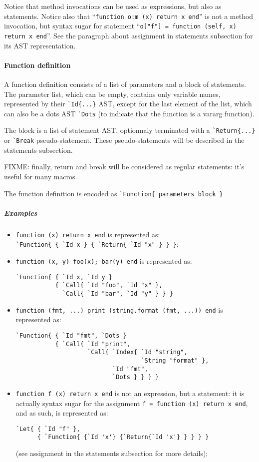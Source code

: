 Notice that method invocations can be used as expressions, but also as
statements.  Notice also that ``{\tt function o:m (x) return x end}'' is
not a method invocation, but syntax sugar for statement
``{\tt o["f"] = function (self, x) return x end}''. See the paragraph
about assignment in statements subsection for its AST representation.


\paragraph{Function definition}
A function definition consists of a list of parameters and a block of
statements. The parameter list, which can be empty, contains only
variable names, represented by their \verb+`Id{...}+ AST, except for
the last element of the list, which can also be a dots AST \verb+`Dots+
(to indicate that the function is a vararg function).

The block is a list of statement AST, optionnaly terminated with a
\verb+`Return{...}+ or \verb+`Break+ pseudo-statement. These
pseudo-statements will be described in the statements subsection.

FIXME: finally, return and break will be considered as regular
statements: it's useful for many macros.

The function definition is encoded as
\verb+`Function{ parameters block }+

\subparagraph{Examples}
\begin{itemize}

\item \verb+function (x) return x end+ is represented as:\\
  \verb+`Function{ { `Id x } { `Return{ `Id "x" } } }+;

\item \verb+function (x, y) foo(x); bar(y) end+ is represented as:
\begin{verbatim}
`Function{ { `Id x, `Id y } 
           { `Call{ `Id "foo", `Id "x" },
             `Call{ `Id "bar", `Id "y" } } }
\end{verbatim}
 
\item \verb+function (fmt, ...) print (string.format (fmt, ...)) end+
  is represented as:
\begin{verbatim}
`Function{ { `Id "fmt", `Dots } 
           { `Call{ `Id "print",
                    `Call{ `Index{ `Id "string",
                                   `String "format" }, 
                           `Id "fmt", 
                           `Dots } } } }
\end{verbatim}

\item \verb+function f (x) return x end+ is not an expression, but a
  statement: it is actually syntax sugar for the assignment {\tt f =
    function (x) return x end}, and as such, is represented as:
\begin{verbatim}
`Let{ { `Id "f" }, 
      { `Function{ {`Id 'x'} {`Return{`Id 'x'} } } } }
\end{verbatim}
  (see assignment in the statements subsection for more details);

\end{itemize}

